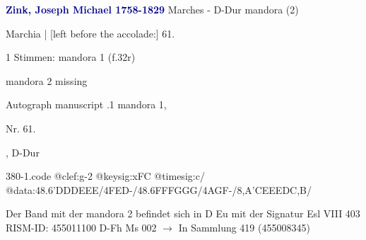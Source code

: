 \documentclass[twocolumn]{book}
\begin{document}
\newline \par \vspace{7pt} \textcolor{darkblue}{\textbf{Zink, Joseph Michael  1758-1829}}
\newline Marches - D-Dur
\newline mandora (2)
\newline \begin{itshape}[f.32r, at left:] Marchia | [left before the accolade:] 61.\end{itshape} 
\newline \textcolor{darkblue}{}  1 Stimmen: mandora 1  (f.32r)
\newline \begin{small} mandora 2 missing\end{small} 
\newline Autograph manuscript
.1  mandora 1, \begin{itshape}Nr. 61.\end{itshape}, D-Dur  
\begin{filecontents*}{380-1.code}
@clef:g-2
@keysig:xFC
@timesig:c/
@data:48.6'D{DD}E{EE}/4FED-/48.6F{FF}G{GG}/4AGF-/8,A'CEEEDC,B/
\end{filecontents*}
\newline
%
\newline Der Band mit der mandora 2 befindet sich in D Eu mit der Signatur Esl VIII 403
\newline RISM-ID: 455011100
\newline D-Fh  Ms 002
\newline $\rightarrow$ In Sammlung 419 (455008345)
      
\end{document}
